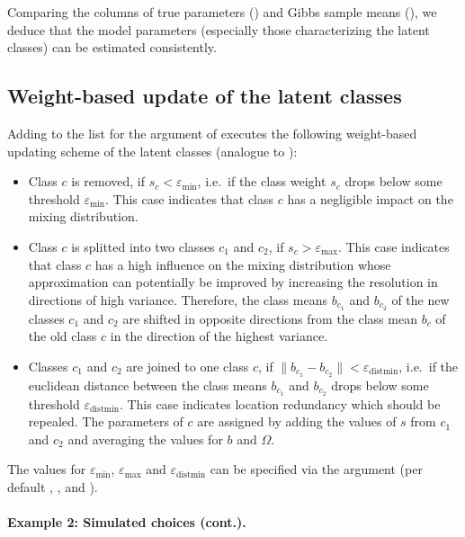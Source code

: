 \documentclass[article]{jss}
\newcommand{\fct}[1]{\code{#1()}}
\begin{document}
Comparing the columns of true parameters () and Gibbs sample means (), we deduce that the model parameters (especially those characterizing the latent classes) can be estimated consistently.

\subsection{Weight-based update of the latent classes} \label{subsec:weight_update}

Adding  to the list for the  argument of \fct{fit\_model} executes the following weight-based updating scheme of the latent classes (analogue to \cite{Bauer:2019}):

\begin{itemize}
  \item Class $c$ is removed, if $s_c<\varepsilon_{\text{min}}$, i.e.\ if the class weight $s_c$ drops below some threshold $\varepsilon_{\text{min}}$. This case indicates that class $c$ has a negligible impact on the mixing distribution.
  \item Class $c$ is splitted into two classes $c_1$ and $c_2$, if $s_c>\varepsilon_\text{max}$. This case indicates that class $c$ has a high influence on the mixing distribution whose approximation can potentially be improved by increasing the resolution in directions of high variance. Therefore, the class means $b_{c_1}$ and $b_{c_2}$ of the new classes $c_1$ and $c_2$ are shifted in opposite directions from the class mean $b_c$ of the old class $c$ in the direction of the highest variance.
  \item Classes $c_1$ and $c_2$ are joined to one class $c$, if $\lVert b_{c_1} - b_{c_2} \rVert<\varepsilon_{\text{distmin}}$, i.e.\ if the euclidean distance between the class means $b_{c_1}$ and $b_{c_2}$  drops below some threshold $\varepsilon_{\text{distmin}}$. This case indicates location redundancy which should be repealed. The parameters of $c$ are assigned by adding the values of $s$ from $c_1$ and $c_2$ and averaging the values for $b$ and $\Omega$.
\end{itemize}

The values for $\varepsilon_{\text{min}}$, $\varepsilon_{\text{max}}$ and $\varepsilon_{\text{distmin}}$ can be specified via the  argument (per default , , and ).

\paragraph{Example 2: Simulated choices (cont.).}
\end{document}
